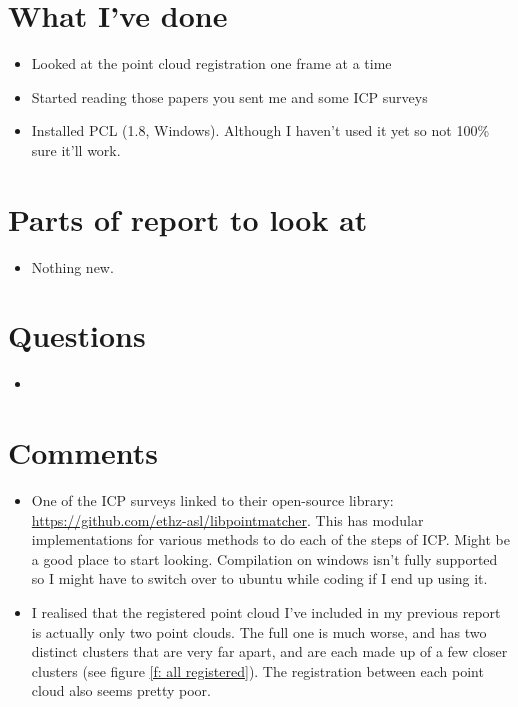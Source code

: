 \documentclass[12pt,a4paper]{article}
\begin{document}
\author{Katrina Ashton}


\pagestyle{fancy}
\fancyhf{}
\rhead{\thepage}

\section{What I've done}
\begin{itemize}
\item{Looked at the point cloud registration one frame at a time}
\item{Started reading those papers you sent me and some ICP surveys}
\item{Installed PCL (1.8, Windows). Although I haven't used it yet so not 100\% sure it'll work.}
\end{itemize}

\section{Parts of report to look at}
\begin{itemize}
\item{Nothing new.}
\end{itemize}

\section{Questions}
\begin{itemize}
\item
\end{itemize}

\section{Comments}
\begin{itemize}
\item One of the ICP surveys linked to their open-source library: \url{https://github.com/ethz-asl/libpointmatcher}. This has modular implementations for various methods to do each of the steps of ICP. Might be a good place to start looking. Compilation on windows isn't fully supported so I might have to switch over to ubuntu while coding if I end up using it.
\item I realised that the registered point cloud I've included in my previous report is actually only two point clouds. The full one is much worse, and has two distinct clusters that are very far apart, and are each made up of a few closer clusters (see figure \ref{f: all registered}). The registration between each point cloud also seems pretty poor.
\end{itemize}
\end{document}
